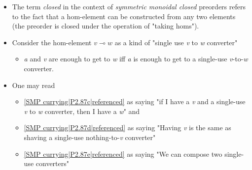 \begin{itemize}
    \item  The term \emph{closed} in the context of \emph{symmetric monoidal closed} preorders refers to the fact that a hom-element can be constructed from any two elements (the preorder is closed under the operation of "taking homs").
    \item Consider the hom-element $v \multimap w$ as a kind of "single use \emph{v} to \emph{w} converter"
          \begin{itemize}
            \item \emph{a} and \emph{v} are enough to get to \emph{w} iff \emph{a} is enough to get to a single-use \emph{v}-to-\emph{w} converter.
          \end{itemize}
    \item One may read
          \begin{itemize}
            \item \ref{SMP currying|P2.87c|referenced} as saying "if I have a \emph{v} and a single-use \emph{v} to \emph{w} converter, then I have a \emph{w}" and
            \item \ref{SMP currying|P2.87d|referenced} as saying "Having \emph{v} is the same as shaving a single-use nothing-to-\emph{v} converter"
            \item \ref{SMP currying|P2.87e|referenced} as saying "We can compose two single-use converters"
          \end{itemize}
  \end{itemize}
